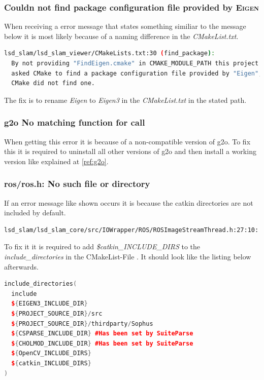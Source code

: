 \subsubsection{Couldn not find package configuration file provided by \textsc{Eigen}}
When receiving a error message that states something similiar to the message below it is most likely because of a naming difference in the \textit{CMakeList.txt}.\newline
\begin{lstlisting}[language=bash]
lsd_slam/lsd_slam_viewer/CMakeLists.txt:30 (find_package):
  By not providing "FindEigen.cmake" in CMAKE_MODULE_PATH this project has
  asked CMake to find a package configuration file provided by "Eigen", but
  CMake did not find one.
\end{lstlisting}
The fix is to rename \textit{Eigen} to \textit{Eigen3} in the \textit{CMakeList.txt} in the stated path.


\subsubsection{g2o No matching function for call}
When getting this error it is because of a non-compatible version of \gls{g2o}. To fix this it is required to uninstall all other versions of \gls{g2o} and then install a working version like explained at \ref{ref:g2o}.

\subsubsection{ros/ros.h: No such file or directory}
If an error message like shown occurs it is because the catkin directories are not included by default.\newline
\begin{lstlisting}[language=bash]
lsd_slam/lsd_slam_core/src/IOWrapper/ROS/ROSImageStreamThread.h:27:10: fatal error: ros/ros.h: No such file or directory
\end{lstlisting}
To fix it it is required to add \textit{\${catkin\_INCLUDE\_DIRS}} to the \textit{include\_directories} in the CMakeList-File \cite{rosroshnosuchfileordirectory}. It should look like the listing below afterwards.\newline
\begin{lstlisting}[language=C++, caption={Fix for ros/ros.h: No such file or directory}]
include_directories(
  include
  ${EIGEN3_INCLUDE_DIR}
  ${PROJECT_SOURCE_DIR}/src
  ${PROJECT_SOURCE_DIR}/thirdparty/Sophus
  ${CSPARSE_INCLUDE_DIR} #Has been set by SuiteParse
  ${CHOLMOD_INCLUDE_DIR} #Has been set by SuiteParse
  ${OpenCV_INCLUDE_DIRS}
  ${catkin_INCLUDE_DIRS}
)
\end{lstlisting}


